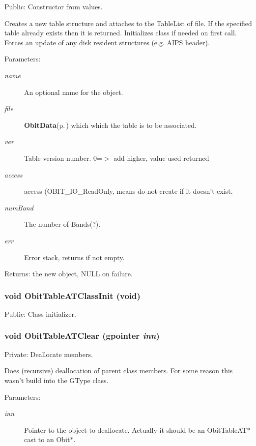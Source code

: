 Public: Constructor from values. 

Creates a new table structure and attaches to the Table\-List of file. If the specified table already exists then it is returned. Initializes class if needed on first call. Forces an update of any disk resident structures (e.g. AIPS header). \begin{Desc}
\item[Parameters:]
\begin{description}
\item[{\em name}]An optional name for the object. \item[{\em file}]{\bf Obit\-Data}{\rm (p.\,\pageref{structObitData})} which which the table is to be associated. \item[{\em ver}]Table version number. 0=$>$ add higher, value used returned \item[{\em access}]access (OBIT\_\-IO\_\-Read\-Only, means do not create if it doesn't exist. \item[{\em num\-Band}]The number of Bands(?). \item[{\em err}]Error stack, returns if not empty. \end{description}
\end{Desc}
\begin{Desc}
\item[Returns:]the new object, NULL on failure. \end{Desc}
\subsubsection{\setlength{\rightskip}{0pt plus 5cm}void Obit\-Table\-ATClass\-Init (void)}\label{ObitTableAT_8c_a27}


Public: Class initializer. 

\subsubsection{\setlength{\rightskip}{0pt plus 5cm}void Obit\-Table\-ATClear (gpointer {\em inn})}\label{ObitTableAT_8c_a9}


Private: Deallocate members. 

Does (recursive) deallocation of parent class members. For some reason this wasn't build into the GType class. \begin{Desc}
\item[Parameters:]
\begin{description}
\item[{\em inn}]Pointer to the object to deallocate. Actually it should be an Obit\-Table\-AT$\ast$ cast to an Obit$\ast$. \end{description}
\end{Desc}
